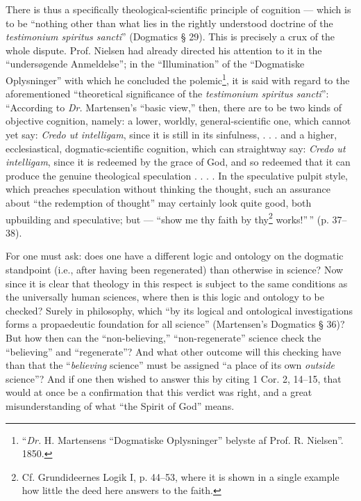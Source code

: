 \documentclass[12pt,a4paper]{book}
\newcommand{\opage}[1]{\marginnote{\footnotesize\textit{[#1]}}}
\begin{document}
There is thus a specifically theological-scientific principle of cognition
--- which is to be ``nothing other than what
lies in the rightly understood doctrine of the \textit{testimonium spiritus
sancti}'' (Dogmatics § 29). This is precisely a crux
of the whole dispute. Prof. Nielsen had already directed his attention
to it in the ``undersøgende Anmeldelse''; in the
``Illumination'' of the ``Dogmatiske Oplysninger'' with which he
concluded the polemic\footnote{``\textit{Dr.} H. Martensens ``Dogmatiske Oplysninger'' belyste af Prof. R.
Nielsen''. 1850.}, it is said with regard to the aforementioned
``theoretical significance of the \textit{testimonium spiritus sancti}'': ``According
to \textit{Dr.} Martensen's ``basic view,'' then, there are to be
two kinds of objective cognition, namely: a lower, worldly,
general-scientific one, which cannot yet say: \textit{Credo ut intelligam},
since it is still in its sinfulness, . . . and a
higher, ecclesiastical, dogmatic-scientific cognition, which can straightway
say: \textit{Credo ut intelligam}, since it is redeemed by the grace
of God, and so redeemed that it can produce the genuine
theological speculation . . . . In the speculative pulpit style,
which preaches speculation without thinking the thought, such
an assurance about ``the redemption of thought'' may certainly look
quite good, both upbuilding and speculative; but --- ``show
me thy faith by thy\footnote{Cf. Grundideernes Logik I, p. 44--53, where it is shown in a single example
how little the deed here answers to the faith.}
works!''\,'' (p. 37--38).

\opage{35}\setcounter{footnote}{0}%
For one must ask: does one have a different logic and
ontology on the dogmatic standpoint (i.e., after having
been regenerated) than otherwise in science? Now since it is
clear that theology in this respect is subject to the same conditions
as the universally human sciences, where then is
this logic and ontology to be checked? Surely in philosophy,
which ``by its logical and ontological investigations
forms a propaedeutic foundation for all science'' (Martensen's
Dogmatics § 36)? But how then can the ``non-believing,'' ``non-regenerate''
science check the ``believing'' and ``regenerate''?
And what other outcome will this checking have than that
the ``\emph{believing} science'' must be assigned ``a place of its own
\emph{outside} science''? And if one then wished to answer this
by citing 1 Cor. 2, 14--15, that would at once
be a confirmation that this verdict was right, and a
great misunderstanding of what ``the Spirit of God'' means.
\end{document}
